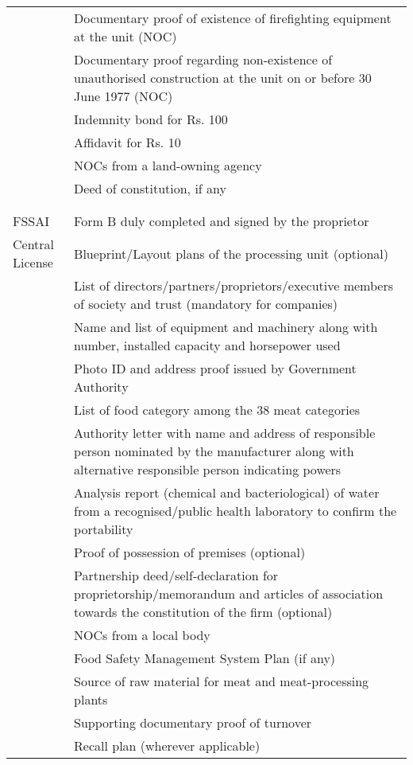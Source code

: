 \documentclass[a4paper, 12pt]{article}
\begin{document}
\begin{longtable}{>{\raggedright}p{2.5cm}>{\raggedright\arraybackslash}p{13cm}}
          & Documentary proof of existence of firefighting equipment at the unit (NOC) \\
          & Documentary proof regarding non-existence of unauthorised construction at the unit on or before 30 June 1977 (NOC) \\
          & Indemnity bond for Rs. 100 \\
          & Affidavit for Rs. 10  \\
          & NOCs from a land-owning agency  \\
          & Deed of constitution, if any \\
	& \\
	&\\
    \midrule
    FSSAI & Form B duly completed and signed by the proprietor \\
    Central License & Blueprint/Layout plans of the processing unit (optional) \\
    & List of directors/partners/proprietors/executive members of society and trust (mandatory for companies) \\
          & Name and list of equipment and machinery along with number, installed capacity and horsepower used \\
          & Photo ID and address proof issued by Government Authority \\
          & List of food category among the 38 meat categories \\
          & Authority letter with name and address of responsible person nominated by the manufacturer along with alternative responsible person indicating powers   \\
          & Analysis report (chemical and bacteriological) of water from a recognised/public health laboratory to confirm the portability \\
          & Proof of possession of premises (optional) \\
          & Partnership deed/self-declaration for proprietorship/memorandum and articles of association towards the constitution of the firm (optional) \\
          & NOCs from a local body  \\
          & Food Safety Management System Plan (if any) \\
          & Source of raw material for meat and meat-processing plants \\
          & Supporting documentary proof of turnover \\
          & Recall plan (wherever applicable) \\

\end{longtable}
\end{document}
